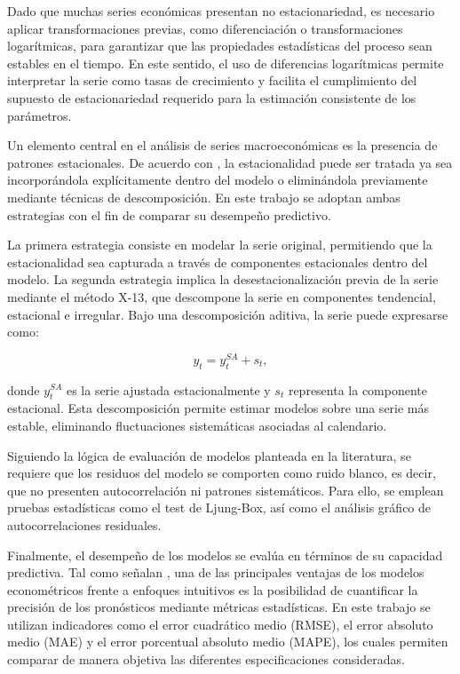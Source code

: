 \documentclass[12pt,a4paper]{article}
\begin{document}
	Dado que muchas series económicas presentan no estacionariedad, es necesario aplicar transformaciones previas, como diferenciación o transformaciones logarítmicas, para garantizar que las propiedades estadísticas del proceso sean estables en el tiempo. En este sentido, el uso de diferencias logarítmicas permite interpretar la serie como tasas de crecimiento y facilita el cumplimiento del supuesto de estacionariedad requerido para la estimación consistente de los parámetros.
	
	Un elemento central en el análisis de series macroeconómicas es la presencia de patrones estacionales. De acuerdo con \cite{PindyckRubinfeld}, la estacionalidad puede ser tratada ya sea incorporándola explícitamente dentro del modelo o eliminándola previamente mediante técnicas de descomposición. En este trabajo se adoptan ambas estrategias con el fin de comparar su desempeño predictivo.
	
	La primera estrategia consiste en modelar la serie original, permitiendo que la estacionalidad sea capturada a través de componentes estacionales dentro del modelo. La segunda estrategia implica la desestacionalización previa de la serie mediante el método X-13, que descompone la serie en componentes tendencial, estacional e irregular. Bajo una descomposición aditiva, la serie puede expresarse como:
	
	\begin{equation}
		y_t = y_t^{SA} + s_t,
	\end{equation}
	
	donde $y_t^{SA}$ es la serie ajustada estacionalmente y $s_t$ representa la componente estacional. Esta descomposición permite estimar modelos sobre una serie más estable, eliminando fluctuaciones sistemáticas asociadas al calendario.
	
	Siguiendo la lógica de evaluación de modelos planteada en la literatura, se requiere que los residuos del modelo se comporten como ruido blanco, es decir, que no presenten autocorrelación ni patrones sistemáticos. Para ello, se emplean pruebas estadísticas como el test de Ljung-Box, así como el análisis gráfico de autocorrelaciones residuales.
	
	Finalmente, el desempeño de los modelos se evalúa en términos de su capacidad predictiva. Tal como señalan \cite{PindyckRubinfeld}, una de las principales ventajas de los modelos econométricos frente a enfoques intuitivos es la posibilidad de cuantificar la precisión de los pronósticos mediante métricas estadísticas. En este trabajo se utilizan indicadores como el error cuadrático medio (RMSE), el error absoluto medio (MAE) y el error porcentual absoluto medio (MAPE), los cuales permiten comparar de manera objetiva las diferentes especificaciones consideradas.
	
\end{document}
